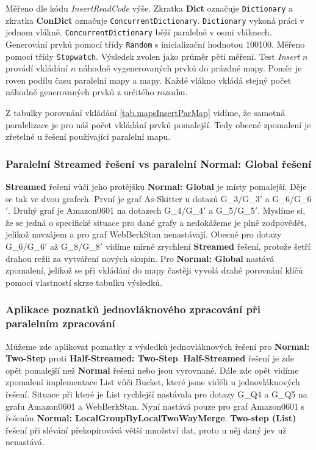 Měřeno dle kódu \textit{InsertReadCode} výše. 
Zkratka \textbf{Dict} označuje \texttt{Dictionary} a zkratka \textbf{ConDict} označuje \texttt{ConcurrentDictionary}. 
\texttt{Dictionary} vykoná práci v jednom vlákně. 
\texttt{ConcurrentDictionary} běží paralelně v osmi vláknech. 
Generování prvků pomocí třídy \texttt{Random} s inicializační hodnotou 100100. 
Měřeno pomocí třídy \texttt{Stopwatch}. 
Výsledek zvolen jako průměr pěti měření. 
Test \textit{Insert} $n$ provádí vkládání $n$ náhodně vygenerovaných prvků do prázdné mapy. 
Poměr je roven podílu času paralelní mapy a mapy. Každé vlákno vkládá stejný počet náhodně generovaných prvků z určitého rozsahu.

Z tabulky porovnání vkládání \ref{tab.mapsInsertParMap} vidíme, že samotná paralelizace je pro náš počet vkládání prvků pomalejší. 
Tedy obecné zpomalení je zřetelné u řešení používající paralelní mapu.

\subsubsection{Paralelní Streamed řešení vs paralelní Normal: Global řešení}

\textbf{Streamed} řešení vůči jeho protějšku \textbf{Normal: Global} je místy pomalejší. 
Děje se tak ve dvou grafech.
První je graf As-Skitter u dotazů  G\_3/G\_3$'$ a  G\_6/G\_6$'$.
Druhý graf je Amazon0601 na dotazech G\_4/G\_4$'$ a  G\_5/G\_5$'$.
Myslíme si, že se jedná o specifické situace pro dané grafy a nedokážeme je plně zodpovědět, jelikož navzájem a pro graf WebBerkStan nenastávají.
Obecně pro dotazy G\_6/G\_6$'$ až G\_8/G\_8$'$ vidíme mírné zrychlení \textbf{Streamed} řešení, protože šetří drahou režii za vytváření nových skupin.
Pro \textbf{Normal: Global} nastává zpomalení, jelikož se při vkládání do mapy častěji vyvolá drahé porovnání klíčů pomocí vlastností skrze tabulku výsledků. 

\subsubsection{Aplikace poznatků jednovláknového zpracování při paralelním zpracování}

Můžeme zde aplikovat poznatky z výsledků jednovláknových řešení pro \textbf{Normal: Two-Step} proti \textbf{Half-Streamed: Two-Step}.
\textbf{Half-Streamed} řešení je zde opět pomalejší než \textbf{Normal} řešení nebo jsou vyrovnané.
Dále zde opět vidíme zpomalení implementace List vůči Bucket, které jsme viděli u jednovláknových řešení.
Situace při které je List rychlejší nastávala pro dotazy G\_Q4 a G\_Q5 na grafu Amazon0601 a WebBerkStan.
Nyní nastává pouze pro graf Amazon0601 s řešením \textbf{Normal: LocalGroupByLocalTwoWayMerge}.
\textbf{Two-step (List)} řešení při slévání překopírovává větší množství dat, proto u něj daný jev už nenastává. 

